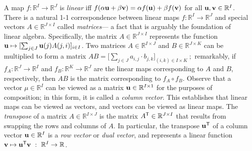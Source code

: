 A map $f : \mathbb R^I \to \mathbb R^J$ is \emph{linear} iff
$f( \alpha \mathbf u + \beta \mathbf v) = \alpha f(\mathbf u) + \beta f(\mathbf v)$ for all $\mathbf u, \mathbf v \in \mathbb R^I$. 
There is a natural
1-1 correspondence between linear maps $f : \mathbb R^I \to \mathbb R^J$ and
special vectors $A \in \mathbb R^{J \times I}$ called \emph{matrices}---%
    a fact that is arguably the foundation of linear algebra.
Specifically, the matrix $A \in \mathbb R^{J\times I}$ represents the function $\mathbf u \mapsto [ \sum_{j \in J} \mathbf u(j) A({j,i}) ]_{i \in I}$.
%
Two matrices $A \in \mathbb R^{I \times J}$ and $B \in \mathbb R^{J \times K}$
can be multiplied to form a matrix
$\displaystyle
    A B = \Big[ \sum_{j \in J} a_{i,j} \cdot b_{j,k} \Big]_{(i,k) \in I \times K}~;
$
remarkably, if $f_A : \mathbb R^{J} \to \mathbb R^{I}$ and $f_B : \mathbb R^{K} \to \mathbb R^J$ are the linear maps corresponding to $A$ and $B$, respectively, then
$A B$ is the matrix corresponding to $f_A \circ f_B$. 
Observe that a vector $\mu \in \mathbb R^I$ can be viewed as
    a matrix $\mathbf u \in \mathbb R^{I \times 1}$ for the purposes of composition; in this form, it is called a \emph{column vector}.
This establishes that linear maps can be viewed as vectors, 
    and vectors can be viewed as linear maps.
The \emph{transpose} of a matrix $A \in \mathbb R^{I \times J}$ is 
the matrix $A^{\sf T} \in \mathbb R^{J \times I}$ that results 
    from swapping the rows and columns of $A$. 
In particular, the transpose $\mathbf u^{\sf T}$ of a column vector $\mathbf u \in \mathbb R^{I}$ 
    is a \emph{row vector} or \emph{dual vector}, 
    and represents a linear function $\mathbf v \mapsto \mathbf u^{\sf T} \mathbf v ~:~ \mathbb R^{I} \to \mathbb R$.



